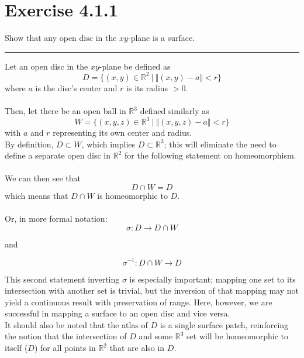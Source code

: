 \documentclass[12pt]{article}
\begin{document}
\maketitle

\section*{Exercise 4.1.1}

Show that any open disc in the $xy$-plane is a surface.

\vspace{1cm}
\hrule
\vspace{1cm}

Let an open disc in the $xy$-plane be defined as
$$
D = \lbrace (x,y) \in \mathbb{R}^2  \ \vert  \ \Vert (x,y)-a \Vert < r \rbrace
$$
where $a$ is the disc's center and $r$ is its radius $> 0$.\\\\
Then, let there be an open ball in $\mathbb{R}^3$ defined similarly as 
$$
W = \lbrace (x,y,z) \in \mathbb{R}^3  \ \vert  \ \Vert (x,y,z)-a \Vert < r \rbrace
$$
with $a$ and $r$ representing its own center and radius.\\
\indent
By definition, $D \subset W$, which implies $D \subset \mathbb{R}^3$; this will eliminate the need to define a separate open disc in $\mathbb{R}^2$ for the following statement on homeomorphism.\\
\\
We can then see that
$$
D \cap W = D
$$	
which means that $D \cap W$ is homeomorphic to $D$.\\\\
Or, in more formal notation:
$$
\sigma : D \rightarrow D \cap W
$$

and

$$
\sigma^{-1} : D \cap W \rightarrow D
$$

This second statement inverting $\sigma$ is especially important; mapping one set to its intersection with another set is trivial, but the inversion of that mapping may not yield a continuous result with preservation of range. Here, however, we are successful in mapping a surface to an open disc and vice versa.\\
\indent
It should also be noted that the atlas of $D$ is a single surface patch, reinforcing the notion that the intersection of $D$ and some $\mathbb{R}^3$ set will be homeomorphic to itself ($D$) for all points in $\mathbb{R}^2$ that are also in $D$.
\end{document}
